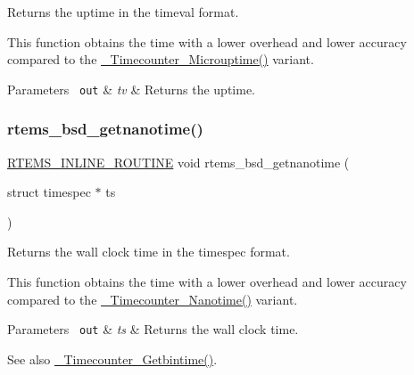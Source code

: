 Returns the uptime in the timeval format. 

This function obtains the time with a lower overhead and lower accuracy compared to the \mbox{\hyperlink{group__RTEMSScoreTimecounter_ga36ddf99626410dfbd01f68db09070df5}{\+\_\+\+Timecounter\+\_\+\+Microuptime()}} variant.


\begin{DoxyParams}[1]{Parameters}
\mbox{\texttt{ out}}  & {\em tv} & Returns the uptime. \\
\hline
\end{DoxyParams}
\mbox{\label{group__RTEMSAPIBSD_ga3503efd308939dc0fafe4912f41ddcc0}} 
\subsubsection{\texorpdfstring{rtems\_bsd\_getnanotime()}{rtems\_bsd\_getnanotime()}}
{\footnotesize\ttfamily \mbox{\hyperlink{group__RTEMSScoreBaseDefs_gac216239df231d5dbd15e3520b0b9313f}{R\+T\+E\+M\+S\+\_\+\+I\+N\+L\+I\+N\+E\+\_\+\+R\+O\+U\+T\+I\+NE}} void rtems\+\_\+bsd\+\_\+getnanotime (\begin{DoxyParamCaption}\item[{struct timespec $\ast$}]{ts }\end{DoxyParamCaption})}



Returns the wall clock time in the timespec format. 

This function obtains the time with a lower overhead and lower accuracy compared to the \mbox{\hyperlink{group__RTEMSScoreTimecounter_ga27875b3222b3884499771611d7902380}{\+\_\+\+Timecounter\+\_\+\+Nanotime()}} variant.


\begin{DoxyParams}[1]{Parameters}
\mbox{\texttt{ out}}  & {\em ts} & Returns the wall clock time.\\
\hline
\end{DoxyParams}
\begin{DoxySeeAlso}{See also}
\mbox{\hyperlink{group__RTEMSScoreTimecounter_gaad315babe0faa38d8e287b6354e7e1f7}{\+\_\+\+Timecounter\+\_\+\+Getbintime()}}. 
\end{DoxySeeAlso}
\mbox{\label{group__RTEMSAPIBSD_ga9f9b8c3ad96826d5e89540d05c5bafb5}} 
